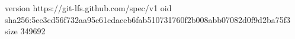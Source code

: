 version https://git-lfs.github.com/spec/v1
oid sha256:5ee3cd56f732aa95c61cdaceb6fab510731760f2b008abb07082d0f9d2ba75f3
size 349692
